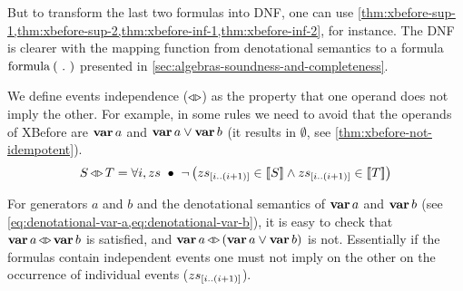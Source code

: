 \begin{sloppypar}
But to transform the last two formulas into \ac{DNF}, one can use \cref{thm:xbefore-sup-1,thm:xbefore-sup-2,thm:xbefore-inf-1,thm:xbefore-inf-2}, for instance.
The \ac{DNF} is clearer with the mapping function from denotational semantics to a formula $\mathrm{formula}_{}\left(~.~\right)$ presented in \cref{sec:algebras-soundness-and-completeness}.
\end{sloppypar}

We define events independence ($\operatorname{\triangleleft\triangleright}$) as the property that one operand does not imply the other.
For example, in some rules we need to avoid that the operands of \ac{XBefore} are $\operatorname{\mathbf{var}} a$ and $\operatorname{\mathbf{var}} a \lor \operatorname{\mathbf{var}} b$ (it results in $\emptyset$, see \cref{thm:xbefore-not-idempotent}).
%
\begin{equation}
\label{law:independent-events}
S \operatorname{\triangleleft\triangleright} T = \forall i, zs ~\bullet~
  \lnot \left(
    zs_{\left[i..\left(i+1\right)\right]} \in \left[\!\left[S\right]\!\right] \land
    zs_{\left[i..\left(i+1\right)\right]} \in \left[\!\left[T\right]\!\right]
  \right)
\end{equation}

\begin{sloppypar}
For generators $a$ and $b$ and the denotational semantics of $\operatorname{\mathbf{var}} a$ and $\operatorname{\mathbf{var}} b$ (see \cref{eq:denotational-var-a,eq:denotational-var-b}), it is easy to check that $\operatorname{\mathbf{var}} a \operatorname{\triangleleft\triangleright} \operatorname{\mathbf{var}} b$ is satisfied, and $\operatorname{\mathbf{var}} a \operatorname{\triangleleft\triangleright} \left(\operatorname{\mathbf{var}} a \lor \operatorname{\mathbf{var}} b\right)$ is not.
Essentially if the formulas contain independent events one must not imply on the other on the occurrence of individual events ($zs_{\left[i..\left(i+1\right)\right]}$).
\end{sloppypar}


